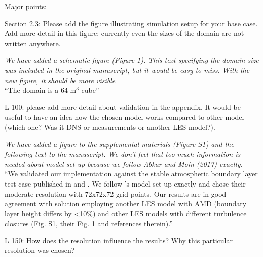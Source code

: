 \documentclass[tc, manuscript]{copernicus}
\begin{document}
Major points:

Section 2.3: Please add the figure illustrating simulation setup for your base case. Add more detail in this figure: currently even the sizes of the domain are not written anywhere.

\textit{We have added a schematic figure (Figure 1). This text specifying the domain size was included in the original manuscript, but it would be easy to miss. With the new figure, it should be more visible}\\
``The domain is a 64 m$^3$ cube''

L 100: please add more detail about validation in the appendix. It would be useful to have an idea how the chosen model works compared to other model (which one? Was it DNS or measurements or another LES model?).

\textit{We have added a figure to the supplemental materials (Figure S1) and the following text to the manuscript. We don't feel that too much information is needed about model set-up because we follow Abkar and Moin (2017) exactly.}\\
``We validated our implementation against the stable atmospheric boundary layer test case published in \citet{abkar_large-eddy_2017} and \citet{stoll_large-eddy_2008}. We follow \citet[]['s]{abkar_large-eddy_2017}'s model set-up exactly and chose their moderate resolution with 72x72x72 grid points. Our results are in good agreement with \citet[]['s]{abkar_large-eddy_2017} solution employing another LES model with AMD (boundary layer height differs by <10\%) and other LES models with different turbulence closures (Fig. S1, their Fig. 1 and references therein).''

L 150: How does the resolution influence the results? Why this particular resolution was chosen?
\end{document}
